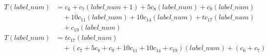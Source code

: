 \begin{subequations}
\label{eq:analyse-detectmarker2-1}
\begin{align}
\label{eq:analyse-detectmarker2-1-1}
T(\mathit{label\_num})& =
c_{6}
+ c_{7}(\mathit{label\_num} + 1)
+ 5c_{8}(\mathit{label\_num})
+ c_{9}(\mathit{label\_num})
\\
& \quad
+ 10c_{11}(\mathit{label\_num})
+ 10c_{14}(\mathit{label\_num})
+ tc_{17}(\mathit{label\_num})
\nonumber \\
& \quad
+ c_{19}(\mathit{label\_num})
\nonumber \\
\label{eq:analyse-detectmarker2-1-2}
T(\mathit{label\_num})& =
tc_{17}(\mathit{label\_num})
\\
& \quad
+ (c_{7} + 5c_{8} + c_{9} + 10c_{11} + 10c_{14} + c_{19}) (\mathit{label\_num})
+ (c_{6} + c_{7})
\nonumber
\end{align}
\end{subequations}

